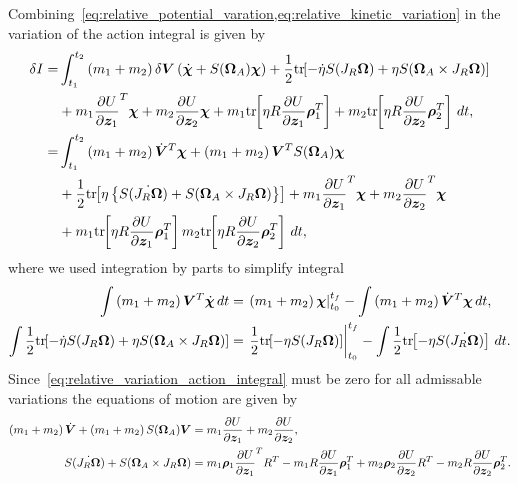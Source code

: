 Combining~\cref{eq:relative_potential_varation,eq:relative_kinetic_variation} in the variation of the action integral is given by
\begin{align}\label{eq:relative_variation_action_integral}
    \delta I =& \int_{t_1}^{t_2} \left( m_1 + m_2 \right) \delta \bm{V} \left( \dot{\bm{\chi}} + S(\bm{\Omega}_A) \bm{\chi} \right) + \frac{1}{2} \mathrm{tr}\negthickspace\left[ - \dot{\eta} S(J_R \bm{\Omega}) + \eta S(\bm{\Omega}_A \times J_R \bm{\Omega}) \right] \nonumber\\
    &+m_1 \frac{\partial U}{\partial \bm{z}_1}^T \bm{\chi} + m_2 \frac{\partial U}{\partial \bm{z}_2} \bm{\chi} + m_1 \mathrm{tr}\negthickspace\left[ \eta R \frac{\partial U}{\partial \bm{z}_1} \bm{\rho}_1^T \right] + m_2 \mathrm{tr}\negthickspace\left[ \eta R \frac{\partial U}{\partial \bm{z}_2} \bm{\rho}_2^T \right] \, dt , \nonumber\\
    =& \int_{t_1}^{t_2} \left( m_1 + m_2 \right) \dot{\bm{V}}^T \bm{\chi} + \left( m_1 + m_2 \right) \bm{V}^T S(\bm{\Omega}_A) \bm{\chi} \nonumber \\
    &+ \frac{1}{2} \mathrm{tr}\negthickspace\left[ \eta \left\{ S(\dot{J_R \bm{\Omega}}) + S(\bm{\Omega}_A \times J_R \bm{\Omega}) \right\} \right] + m_1 \frac{\partial U}{\partial \bm{z}_1}^T \bm{\chi} + m_2 \frac{\partial U}{\partial \bm{z}_2}^T \bm{\chi} \nonumber\\
    &+ m_1 \mathrm{tr}\negthickspace\left[ \eta R \frac{\partial U}{\partial \bm{z}_1} \bm{\rho}_1^T \right] m_2 \mathrm{tr}\negthickspace\left[ \eta R \frac{\partial U}{\partial \bm{z}_2} \bm{\rho}_2^T \right] \, dt ,
\end{align}
where we used integration by parts to simplify integral
\begin{align*}
    \int \left( m_1 + m_2 \right) \bm{V}^T \dot{\bm{\chi}} \, dt &= \left. \left( m_1 + m_2  \right) \bm{\chi} \right|_{t_0}^{t_f} - \int \left( m_1 +m_2 \right) \dot{\bm{V}}^T \bm{\chi} \, dt , \\
    \int \frac{1}{2} \mathrm{tr}\negthickspace\left[ - \dot{\eta} S(J_R \bm{\Omega}) + \eta S(\bm{\Omega}_A \times J_R \bm{\Omega}) \right] &= \left. \frac{1}{2} \mathrm{tr}\negthickspace\left[ -\eta S(J_R \bm{\Omega}) \right] \right|_{t_0}^{t_f} - \int \frac{1}{2} \mathrm{tr}\negthickspace\left[ -\eta S(\dot{J_R \bm{\Omega}}) \right] \, dt.
\end{align*}
Since~\cref{eq:relative_variation_action_integral} must be zero for all admissable variations the  equations of motion are given by
\begin{align}\label{eq:relative_eoms}
    \left( m_1 +m_2 \right) \dot{\bm{V}} + \left( m_1 + m_2 \right) S(\bm{\Omega}_A) \bm{V} &= m_1 \frac{\partial U}{\partial \bm{z}_1} + m_2 \frac{\partial U}{\partial \bm{z}_2} , \\
    S(\dot{J_R \bm{\Omega}}) + S(\bm{\Omega}_A \times J_R \bm{\Omega}) &= m_1 \bm{\rho}_1 \frac{\partial U}{\partial \bm{z}_1}^T R^T - m_1 R \frac{\partial U}{\partial \bm{z}_1} \bm{\rho}_1^T + m_2 \bm{\rho}_2 \frac{\partial U}{\partial \bm{z}_2} R^T - m_2 R \frac{\partial U}{\partial \bm{z}_2} \bm{\rho}_2^T .
\end{align}
